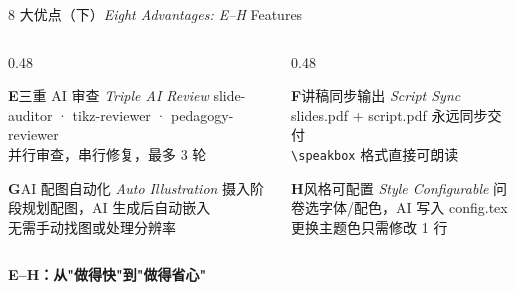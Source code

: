 \documentclass[aspectratio=169,10pt]{beamer}
\newcommand{\EN}[1]{\textit{#1}}
\newcommand{\sectag}[1]{\textmd{\small\normalfont\textcolor{deepblue!60}{#1}}}
\newcommand{\cluetag}[1]{\begin{center}\footnotesize\textcolor{accent}{\textbf{#1}}\end{center}}
\begin{document}
\begin{frame}[t,shrink=3]{8 大优点（下）\EN{Eight Advantages: E--H} \sectag{Features}}
  \begin{columns}[T]
    \begin{column}{0.48\textwidth}
      \begin{alertblock}{\textcolor{accent}{\large\bfseries E}\quad 三重 AI 审查 \EN{Triple AI Review}}
        \footnotesize
        slide-auditor · tikz-reviewer · pedagogy-reviewer\\
        并行审查，串行修复，最多 3 轮
      \end{alertblock}
      \vspace{6pt}
      \begin{alertblock}{\textcolor{accent}{\large\bfseries G}\quad AI 配图自动化 \EN{Auto Illustration}}
        \footnotesize
        摄入阶段规划配图，AI 生成后自动嵌入\\
        无需手动找图或处理分辨率
      \end{alertblock}
    \end{column}
    \begin{column}{0.48\textwidth}
      \begin{block}{\textcolor{deepblue}{\large\bfseries F}\quad 讲稿同步输出 \EN{Script Sync}}
        \footnotesize
        slides.pdf + script.pdf 永远同步交付\\
        \texttt{\textbackslash speakbox} 格式直接可朗读
      \end{block}
      \vspace{6pt}
      \begin{block}{\textcolor{deepblue}{\large\bfseries H}\quad 风格可配置 \EN{Style Configurable}}
        \footnotesize
        问卷选字体/配色，AI 写入 config.tex\\
        更换主题色只需修改 1 行
      \end{block}
    \end{column}
  \end{columns}
  \vspace{4pt}
  \cluetag{E--H：从"做得快"到"做得省心"}
\end{frame}
\end{document}
